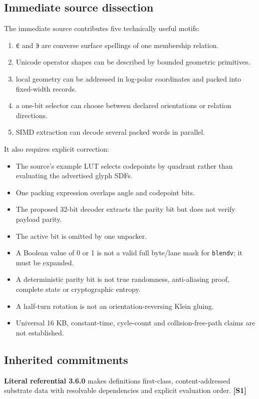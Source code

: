 \documentclass[11pt,a4paper]{article}
\newcommand{\source}[1]{\textcolor{UGTSPurple}{\textbf{[#1]}}}
\begin{document}
\subsection{Immediate source dissection}
The immediate source contributes five technically useful motifs:
\begin{enumerate}
\item \texttt{∈} and \texttt{∋} are converse surface spellings of one membership relation.
\item Unicode operator shapes can be described by bounded geometric primitives.
\item local geometry can be addressed in log-polar coordinates and packed into fixed-width records.
\item a one-bit selector can choose between declared orientations or relation directions.
\item SIMD extraction can decode several packed words in parallel.
\end{enumerate}

It also requires explicit correction:
\begin{itemize}
\item The source's example LUT selects codepoints by quadrant rather than evaluating the advertised glyph SDFs.
\item One packing expression overlaps angle and codepoint bits.
\item The proposed 32-bit decoder extracts the parity bit but does not verify payload parity.
\item The active bit is omitted by one unpacker.
\item A Boolean value of 0 or 1 is not a valid full byte/lane mask for \texttt{blendv}; it must be expanded.
\item A deterministic parity bit is not true randomness, anti-aliasing proof, complete state or cryptographic entropy.
\item A half-turn rotation is not an orientation-reversing Klein gluing.
\item Universal 16 KB, constant-time, cycle-count and collision-free-path claims are not established.
\end{itemize}

\subsection{Inherited commitments}
\textbf{Literal referential 3.6.0} makes definitions first-class, content-addressed substrate data with resolvable dependencies and explicit evaluation order. \source{S1}
\end{document}
